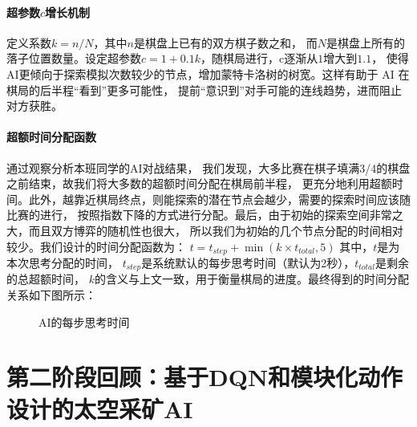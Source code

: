 \documentclass{article}
\begin{document}
\paragraph{超参数$c$增长机制} 定义系数$k=n/N$，其中$n$是棋盘上已有的双方棋子数之和，
而$N$是棋盘上所有的落子位置数量。设定超参数$c=1+0.1k$，随棋局进行，c逐渐从$1$增大到$1.1$，
使得AI更倾向于探索模拟次数较少的节点，增加蒙特卡洛树的树宽。这样有助于 AI 在棋局的后半程“看到”更多可能性，
提前“意识到”对手可能的连线趋势，进而阻止对方获胜。

\paragraph{超额时间分配函数} 通过观察分析本班同学的AI对战结果，
我们发现，大多比赛在棋子填满3/4的棋盘之前结束，故我们将大多数的超额时间分配在棋局前半程，
更充分地利用超额时间。此外，越靠近棋局终点，则能探索的潜在节点会越少，需要的探索时间应该随比赛的进行，
按照指数下降的方式进行分配。最后，由于初始的探索空间非常之大，而且双方博弈的随机性也很大，
所以我们为初始的几个节点分配的时间相对较少。我们设计的时间分配函数为：
$t = t_{step} + \min (k \times t_{total}, 5)$ 其中，$t$是为本次思考分配的时间，
$t_{step}$是系统默认的每步思考时间（默认为2秒），$t_{total}$是剩余的总超额时间，
$k$的含义与上文一致，用于衡量棋局的进度。最终得到的时间分配关系如下图所示：
\begin{figure}[H]
    \centering
    \quad    
	\caption{AI的每步思考时间}
\end{figure}

\section{第二阶段回顾：基于DQN和模块化动作设计的太空采矿AI}
\end{document}
